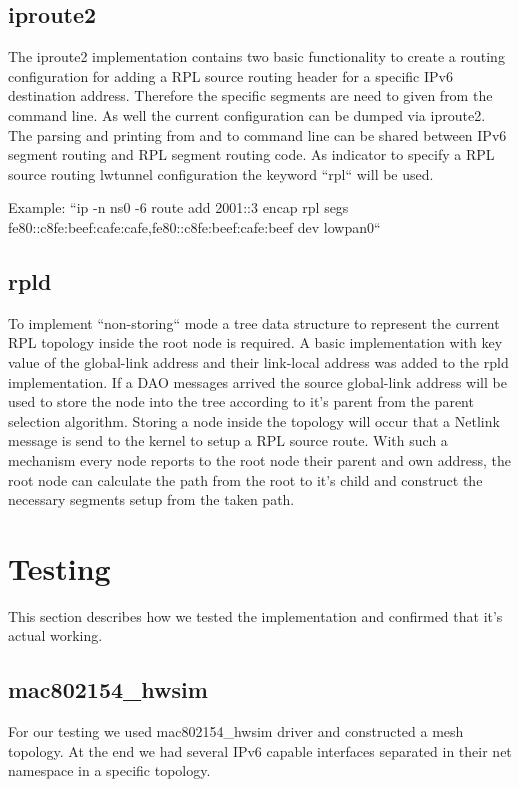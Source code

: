 \documentclass[letterpaper]{article}
\begin{document}
\subsection{iproute2}

The iproute2 implementation contains two basic functionality to create a routing configuration for adding a RPL source routing header for a specific IPv6 destination address.
Therefore the specific segments are need to given from the command line.
As well the current configuration can be dumped via iproute2.
The parsing and printing from and to command line can be shared between IPv6 segment routing and RPL segment routing code.
As indicator to specify a RPL source routing lwtunnel configuration the keyword ``rpl`` will be used.

Example: ``ip -n ns0 -6 route add 2001::3 encap rpl segs fe80::c8fe:beef:cafe:cafe,fe80::c8fe:beef:cafe:beef dev lowpan0``

\subsection{rpld}

To implement ``non-storing`` mode a tree data structure to represent the current RPL topology inside the root node is required.
A basic implementation with key value of the global-link address and their link-local address was added to the rpld implementation.
If a DAO messages arrived the source global-link address will be used to store the node into the tree according to it's parent from the parent selection algorithm.
Storing a node inside the topology will occur that a Netlink message is send to the kernel to setup a RPL source route.
With such a mechanism every node reports to the root node their parent and own address, the root node can calculate the path from the root to it's child and construct the necessary segments setup from the taken path.

\section{Testing}

This section describes how we tested the implementation and confirmed that it's actual working.

\subsection{mac802154\_hwsim}

For our testing we used mac802154\_hwsim driver and constructed a mesh topology.
At the end we had several IPv6 capable interfaces separated in their net namespace in a specific topology.
\end{document}

